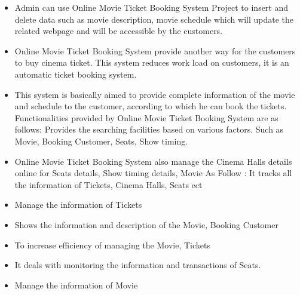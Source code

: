 \documentclass[oneside,a4paper,12pt]{report}
\begin{document}
\begin{itemize}
    \item Admin can use Online Movie Ticket Booking System Project to insert and delete data such as movie description, movie schedule which will update the related webpage and will be accessible by the customers. 
    \item Online Movie Ticket Booking System provide another way for the customers to buy cinema ticket. This system reduces work load on customers, it is an automatic ticket booking system. 
    \item This system is basically aimed to provide complete information of the movie and schedule to the customer, according to which he can book the tickets. 
Functionalities provided by Online Movie Ticket Booking System are as follows: 
Provides the searching facilities based on various factors. Such as Movie, Booking 
Customer, Seats, Show timing.
    \item Online Movie Ticket Booking System also manage the Cinema Halls details online for Seats details, Show timing details, Movie As Follow : 
It tracks all the information of Tickets, Cinema Halls, Seats ect 
    \item Manage the information of Tickets 
    \item Shows the information and description of the Movie, Booking Customer 
    \item To increase efficiency of managing the Movie, Tickets 
    \item It deals with monitoring the information and transactions of Seats. 
    \item Manage the information of Movie 
\end{itemize}

\end{document}
